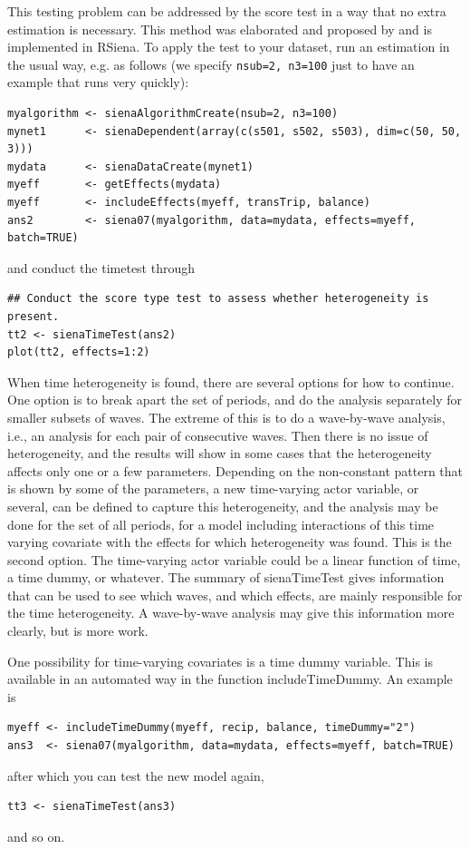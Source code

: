 \documentclass[a4paper,fleqn,11pt]{article}
\newcommand{\+}{\, + \,}
\newcommand{\sfn}[1]{\textsf{#1}}
\begin{document}
This testing problem can be addressed by the score test in a way that
no extra estimation is necessary. This method was elaborated and proposed by
\citet{Lospinoso2011} and is implemented in RSiena.  To apply the
test to your dataset, run an estimation in the usual way, e.g. as follows
(we specify \texttt{nsub=2, n3=100} just to have an example that runs
very quickly):
\begin{verbatim}
myalgorithm <- sienaAlgorithmCreate(nsub=2, n3=100)
mynet1      <- sienaDependent(array(c(s501, s502, s503), dim=c(50, 50, 3)))
mydata      <- sienaDataCreate(mynet1)
myeff       <- getEffects(mydata)
myeff       <- includeEffects(myeff, transTrip, balance)
ans2        <- siena07(myalgorithm, data=mydata, effects=myeff, batch=TRUE)
\end{verbatim}
and conduct the timetest through
\begin{verbatim}
## Conduct the score type test to assess whether heterogeneity is present.
tt2 <- sienaTimeTest(ans2)
plot(tt2, effects=1:2)
\end{verbatim}

When time heterogeneity is found, there are several options for how to continue.
One option is to break apart the set of periods, and do the analysis separately
for smaller subsets of waves. The extreme of this is to do a wave-by-wave analysis,
i.e., an analysis for each pair of consecutive waves.
Then there is no issue of heterogeneity, and the results
will show in some cases that the heterogeneity affects only one or a few parameters.
Depending on the non-constant pattern that is shown by some of the parameters,
a new time-varying actor variable, or several, can be defined to
capture this heterogeneity,
and the analysis may be done for the set of all periods, for a model including
interactions of this time varying covariate with the effects for
which heterogeneity was found. This is the second option.
The time-varying actor variable could be a linear function of time, a time dummy,
or whatever.
The summary of \sfn{sienaTimeTest} gives information that can
be used to see which waves, and which effects, are mainly responsible for
the time heterogeneity. A wave-by-wave analysis may give this information
more clearly, but is more work.

One possibility for time-varying covariates is a time dummy variable.
This is available in an automated way in the
function \sfn{includeTimeDummy}. An example is
\begin{verbatim}
myeff <- includeTimeDummy(myeff, recip, balance, timeDummy="2")
ans3  <- siena07(myalgorithm, data=mydata, effects=myeff, batch=TRUE)
\end{verbatim}
after which you can test the new model again,
\begin{verbatim}
tt3 <- sienaTimeTest(ans3)
\end{verbatim}
and so on.
\end{document}
